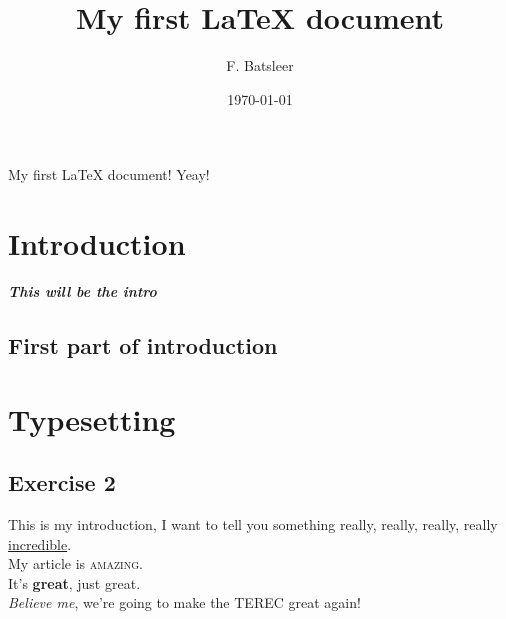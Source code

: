 \documentclass[a4paper,12pt]{article} %
\begin{document}
\title{My first \LaTeX{} document}
\author[1]{F. Batsleer}
\date{\today}
\maketitle



\tableofcontents
\clearpage

My first \LaTeX{} document! Yeay!\\
\section{Introduction}
\textit{\textbf{This will be the intro}}
\subsection{First part of introduction}
\clearpage

\section{Typesetting}
\subsection{Exercise 2}
This is my {\huge introduction}, I want to tell you something {\tiny really}, {\small really}, really, {\color{red} \Large really} \underline{incredible}.\\
My article is \textsc{amazing}.\\
It's \textbf{great}, just great.\\
\textit{Believe me}, we're going to make the \textsc{\color{green} TEREC} great again!\\
\end{document}
